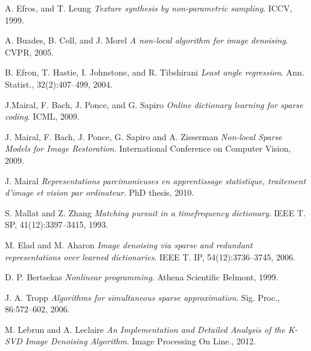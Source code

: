 \documentclass{ipol}
\begin{document}
\begin{thebibliography}{9}

	A. Efros, and T. Leung
	\emph{Texture synthesis by non-parametric sampling}.
	ICCV,
	1999.

	A. Buades, B. Coll, and J. Morel
	\emph{A non-local algorithm for image denoising}.
	CVPR,
	2005.

	B. Efron, T. Hastie, I. Johnstone, and R. Tibshirani
	\emph{Least angle regression}. 
	Ann. Statist.,
	32(2):407–499,
	2004.

	J.Mairal, F. Bach, J. Ponce, and G. Sapiro
	\emph{Online dictionary learning for sparse coding}.
	ICML,
	2009.

	J. Mairal, F. Bach, J. Ponce, G. Sapiro and A. Zisserman
	\emph{ Non-local Sparse Models for Image Restoration}.
	International Conference on Computer Vision,
	2009.

	J. Mairal
	\emph{ Representations parcimonieuses en apprentissage statistique, traitement d’image et
vision par ordinateur}.
	PhD thesis,
	2010.

	S. Mallat and Z. Zhang
 	\emph{Matching pursuit in a timefrequency dictionary}.
	IEEE T. SP,
	41(12):3397–3415,
	1993.

	M. Elad and M. Aharon
	\emph{Image denoising via sparse and redundant representations over learned dictionaries}.
	IEEE T.
	IP, 54(12):3736–3745,
	2006.
	
	D. P. Bertsekas
	\emph{Nonlinear programming}.
	Athena Scientific Belmont,
	1999.
	
	J. A. Tropp
	\emph{Algorithms for simultaneous sparse approximation}.
	Sig. Proc.,
	86:572–602,
	2006.
	
	M. Lebrun and A. Leclaire
	\emph{{An Implementation and Detailed Analysis of the K-SVD Image Denoising Algorithm}}.
	{{Image Processing On Line}}.,
	2012.

\end{thebibliography}
\end{document}
